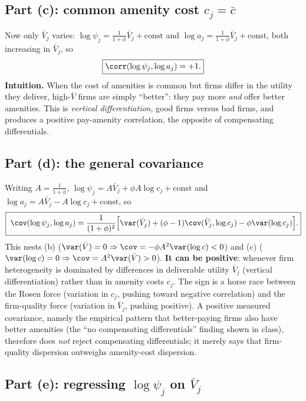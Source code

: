 \documentclass[11pt]{article}
\begin{document}
\subsection*{Part (c): common amenity cost $c_j=\bar c$}

Now only $\bar V_j$ varies:
$\log\psi_j=\tfrac{1}{1+\phi}\bar V_j+\text{const}$ and
$\log a_j=\tfrac{1}{1+\phi}\bar V_j+\text{const}$, both increasing in
$\bar V_j$, so
\[
\boxed{\corr(\log\psi_j,\log a_j)=+1.}
\]
\textbf{Intuition.} When the cost of amenities is common but firms differ in the
utility they deliver, high-$\bar V$ firms are simply ``better'': they pay more
\emph{and} offer better amenities. This is \emph{vertical differentiation}, good
firms versus bad firms, and produces a positive pay-amenity correlation, the
opposite of compensating differentials.

\subsection*{Part (d): the general covariance}

Writing $A=\tfrac{1}{1+\phi}$, $\log\psi_j=A\bar V_j+\phi A\log c_j+\text{const}$
and $\log a_j=A\bar V_j-A\log c_j+\text{const}$, so
\begin{equation}
\boxed{\;\cov(\log\psi_j,\log a_j)=\frac{1}{(1+\phi)^2}
  \Bigl[\var(\bar V_j)+(\phi-1)\cov(\bar V_j,\log c_j)-\phi\var(\log c_j)\Bigr].}
\end{equation}
This nests (b) ($\var(\bar V)=0\Rightarrow\cov=-\phi A^2\var(\log c)<0$) and (c)
($\var(\log c)=0\Rightarrow\cov=A^2\var(\bar V)>0$). \textbf{It can be positive}:
whenever firm heterogeneity is dominated by differences in deliverable utility
$\bar V_j$ (vertical differentiation) rather than in amenity costs $c_j$. The
sign is a horse race between the Rosen force (variation in $c_j$, pushing toward
negative correlation) and the firm-quality force (variation in $\bar V_j$,
pushing positive). A positive measured covariance, namely the empirical pattern
that better-paying firms also have better amenities (the ``no compensating
differentials'' finding shown in class), therefore does \emph{not} reject
compensating differentials; it merely says that firm-quality dispersion
outweighs amenity-cost dispersion.

\subsection*{Part (e): regressing $\log\psi_j$ on $\bar V_j$}
\end{document}
